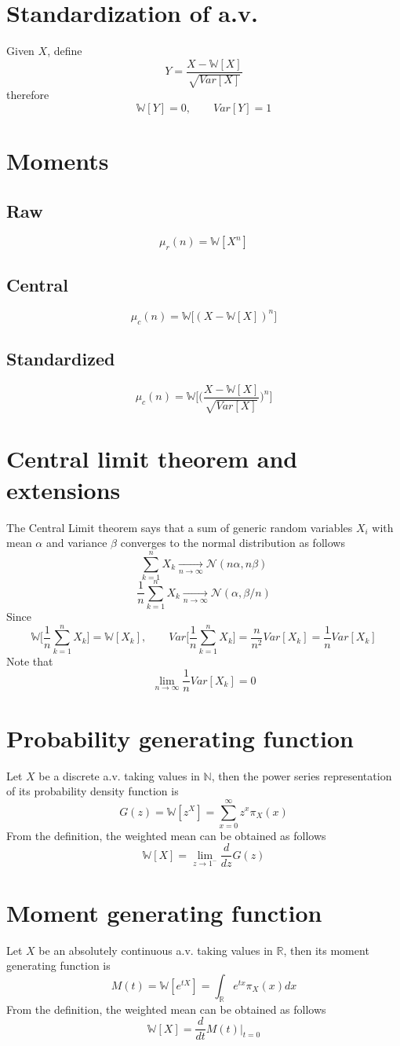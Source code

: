 \documentclass[12pt]{article}
\begin{document}
\section{Standardization of a.v.}
Given $X$, define
$$Y=\frac{X-\mathbb{W}[X]}{\sqrt{Var[X]}}$$
therefore
$$\mathbb{W}[Y]=0,\qquad Var[Y]=1$$
\section{Moments}
\subsection{Raw}
$$\mu_r(n)=\mathbb{W}[X^n]$$
\subsection{Central}
$$\mu_c(n)=\mathbb{W}\big[(X-\mathbb{W}[X])^n\big]$$
\subsection{Standardized}
$$\mu_c(n)=\mathbb{W}\bigg[\bigg(\frac{X-\mathbb{W}[X]}{\sqrt{Var[X]}}\bigg)^n\bigg]$$
\section{Central limit theorem and extensions}
The Central Limit theorem says that a sum of generic random variables $X_i$ with mean $\alpha$ and variance $\beta$ converges to the normal distribution as follows
$$\sum_{k=1}^{n}X_k\xrightarrow[n\to\infty]{}\mathcal{N}(n\alpha,n\beta)$$
$$\frac{1}{n}\sum_{k=1}^{n}X_k\xrightarrow[n\to\infty]{}\mathcal{N}(\alpha,\beta/n)$$
Since
$$\mathbb{W}\bigg[\frac{1}{n}\sum_{k=1}^{n}X_k\bigg]=\mathbb{W}[X_k],\qquad Var\bigg[\frac{1}{n}\sum_{k=1}^{n}X_k\bigg]=\frac{n}{n^2}Var[X_k]=\frac{1}{n}Var[X_k]$$
Note that
$$\lim_{n\to \infty}\frac{1}{n}Var[X_k]=0$$
\clearpage
\section{Probability generating function}
Let $X$ be a discrete a.v. taking values in $\mathbb{N}$, then the power series representation of its probability density function is 
$$G(z)=\mathbb{W}[z^X]=\sum_{x=0}^\infty z^x\pi_X(x)$$
From the definition, the weighted mean can be obtained as follows
$$\mathbb{W}[X]=\lim_{z\to 1^-}\frac{d}{dz}G(z)$$
\section{Moment generating function}
Let $X$ be an absolutely continuous a.v. taking values in $\mathbb{R}$, then its moment generating function is 
$$M(t)=\mathbb{W}[e^{tX}]=\int_{\mathbb{R}}e^{tx}\pi_X(x)dx$$
From the definition, the weighted mean can be obtained as follows
$$\mathbb{W}[X]=\frac{d}{dt}M(t)\bigg\rvert_{t=0}$$
\clearpage
\end{document}
